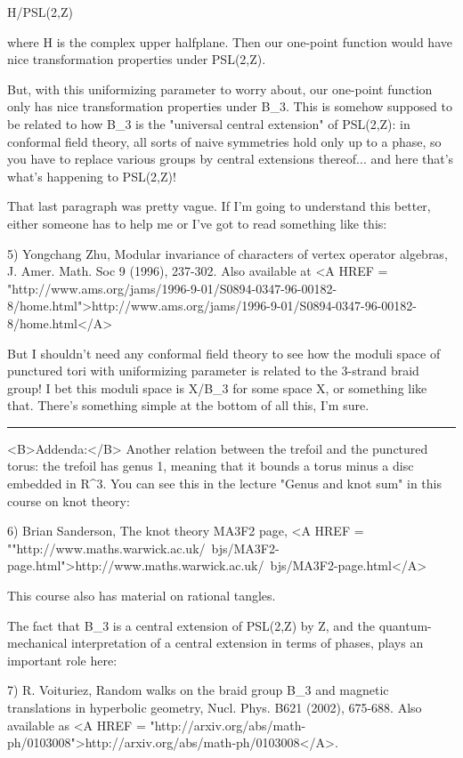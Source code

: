 H/PSL(2,Z)

where H is the complex upper halfplane.  Then our one-point function
would have nice transformation properties under PSL(2,Z).  

But, with this uniformizing parameter to worry about, our one-point 
function only has nice transformation properties under B_{3}.  This 
is somehow supposed to be related to how B_{3} is the "universal
central extension" of PSL(2,Z): in conformal field theory, all sorts
of naive symmetries hold only up to a phase, so you have to replace
various groups by central extensions thereof... and here that's what's 
happening to PSL(2,Z)!

That last paragraph was pretty vague.  If I'm going to understand this
better, either someone has to help me or I've got to read something
like this:

5) Yongchang Zhu, Modular invariance of characters of vertex operator algebras,
J. Amer. Math. Soc 9 (1996), 237-302.  Also available at
<A HREF = "http://www.ams.org/jams/1996-9-01/S0894-0347-96-00182-8/home.html">http://www.ams.org/jams/1996-9-01/S0894-0347-96-00182-8/home.html</A>


But I shouldn't need any conformal field theory to see how the moduli
space of punctured tori with uniformizing parameter is related to the
3-strand braid group!  I bet this moduli space is X/B_{3} for
some space X, or something like that.  There's something simple at the
bottom of all this, I'm sure.

\par\noindent\rule{\textwidth}{0.4pt}
<B>Addenda:</B>  Another relation between the trefoil and
the punctured torus: the trefoil has genus 1, meaning that
it bounds a torus minus a disc embedded in R^{3}.
You can see this in the lecture "Genus and knot sum" in 
this course on knot theory:

6) Brian Sanderson, The knot theory MA3F2 page, 
<A HREF = ""http://www.maths.warwick.ac.uk/~bjs/MA3F2-page.html">http://www.maths.warwick.ac.uk/~bjs/MA3F2-page.html</A>

This course also has material on rational tangles.

The fact that B_{3} is a central extension of
PSL(2,Z) by Z, and the quantum-mechanical interpretation of
a central extension in terms of phases, plays an important role
here:


7) R. Voituriez, Random walks on the braid group B_{3} 
and magnetic translations in hyperbolic geometry, Nucl. Phys. B621 
(2002), 675-688.  Also available as 
<A HREF = "http://arxiv.org/abs/math-ph/0103008">http://arxiv.org/abs/math-ph/0103008</A>.


